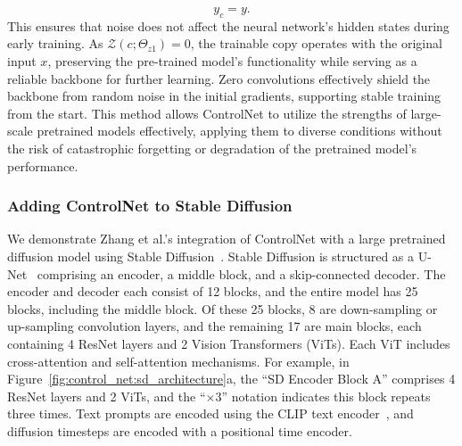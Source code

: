 \[
y_c = y.
\]
This ensures that noise does not affect the neural network's hidden states during early training. As $\mathcal{Z}(c; \Theta_{z1}) = 0$, the trainable copy operates with the original input $x$, preserving the pre-trained model's functionality while serving as a reliable backbone for further learning. Zero convolutions effectively shield the backbone from random noise in the initial gradients, supporting stable training from the start. This method allows ControlNet to utilize the strengths of large-scale pretrained models effectively, applying them to diverse conditions without the risk of catastrophic forgetting or degradation of the pretrained model's performance. 

\subsubsection{Adding ControlNet to Stable Diffusion}
We demonstrate Zhang et al.'s integration of ControlNet with a large pretrained diffusion model using Stable Diffusion~\cite{rombach2022stablediffusion}. Stable Diffusion is structured as a U-Net~\cite{ronneberger2015unetconvolutionalnetworksbiomedical} comprising an encoder, a middle block, and a skip-connected decoder. The encoder and decoder each consist of 12 blocks, and the entire model has 25 blocks, including the middle block. Of these 25 blocks, 8 are down-sampling or up-sampling convolution layers, and the remaining 17 are main blocks, each containing 4 ResNet layers and 2 Vision Transformers (ViTs). Each ViT includes cross-attention and self-attention mechanisms. For example, in Figure~\ref{fig:control_net:sd_architecture}a, the ``SD Encoder Block A'' comprises 4 ResNet layers and 2 ViTs, and the ``$\times$3'' notation indicates this block repeats three times. Text prompts are encoded using the CLIP text encoder~\cite{radford2021learningtransferablevisualmodels}, and diffusion timesteps are encoded with a positional time encoder.
